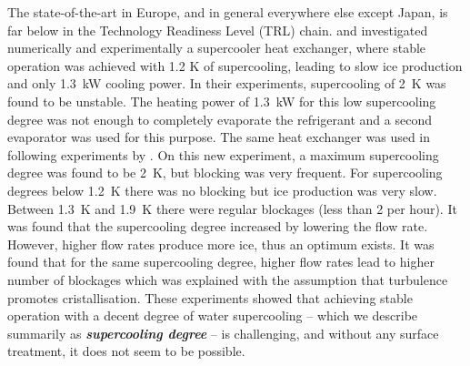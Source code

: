 The state-of-the-art in Europe, and in general everywhere else except Japan, is far below in the Technology Readiness Level (TRL) chain. 
\cite{castaing-lasvignottes_dynamic_2006} and \cite{bedecarrats_ice_2010} investigated numerically and experimentally a supercooler heat exchanger, where stable operation was achieved with 1.2 K of supercooling, leading to slow ice production and only 1.3~kW cooling power.
In their experiments, supercooling of 2~K was found to be unstable. The heating power of 1.3~kW for this low supercooling degree was not enough to completely evaporate the refrigerant and a second evaporator was used for this purpose. %
The same heat exchanger was used in following experiments by \cite{bedecarrats_ice_2010}. On this new experiment, a maximum supercooling degree was found to be 2~K, but blocking was very frequent. For supercooling degrees below 1.2~K there was no blocking but ice production was very slow. Between 1.3~K and 1.9~K there were regular blockages (less than 2 per hour).
It was found that the supercooling degree increased by lowering the flow rate. However, higher flow rates produce more ice, thus an optimum exists.
It was found that for the same supercooling degree, higher flow rates lead to higher number of blockages which was explained with the assumption that turbulence promotes cristallisation. 
These experiments showed that achieving stable operation with a decent degree of water supercooling -- which we describe summarily as \textbf{\em supercooling degree} -- is challenging, and without any surface treatment, it does not seem to be possible.


